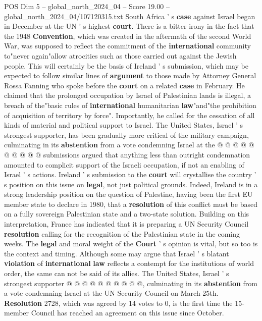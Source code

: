 \begin{textsample}{POS Dim 5 – global\_north\_2024\_04 – Score 19.00 – global\_north\_2024\_04/107120315.txt}  \label{ex:f5_pos_263}
South Africa ' s \textbf{case} against Israel began in December at the UN ' s highest \textbf{court}.
There is a bitter irony in the fact that the 1948 \textbf{Convention}, which was created in the aftermath of the second World War, was supposed to reflect the commitment of the \textbf{international} community to"never again"allow atrocities such as those carried out against the Jewish people.
This will certainly be the basis of Ireland ' s submission, which may be expected to follow similar lines of \textbf{argument} to those made by Attorney General Rossa Fanning who spoke before the \textbf{court} on a related \textbf{case} in February.
He claimed that the prolonged occupation by Israel of Palestinian lands is illegal, a breach of the"basic rules of \textbf{international} humanitarian \textbf{law}"and"the prohibition of acquisition of territory by force".
Importantly, he called for the cessation of all kinds of material and political support to Israel.
The United States, Israel ' s strongest supporter, has been gradually more critical of the military campaign, culminating in its \textbf{abstention} from a vote condemning Israel at the @ @ @ @ @ @ @ @ @ @ submissions argued that anything less than outright condemnation amounted to complicit support of the Israeli occupation, if not an enabling of Israel ' s actions.
Ireland ' s submission to the \textbf{court} will crystallise the country ' s position on this issue on \textbf{legal}, not just political grounds.
Indeed, Ireland is in a strong leadership position on the question of Palestine, having been the first EU member state to declare in 1980, that a \textbf{resolution} of this conflict must be based on a fully sovereign Palestinian state and a two-state solution.
Building on this interpretation, France has indicated that it is preparing a UN Security Council \textbf{resolution} calling for the recognition of the Palestinian state in the coming weeks.
The \textbf{legal} and moral weight of the \textbf{Court} ' s opinion is vital, but so too is the context and timing.
Although some may argue that Israel ' s blatant \textbf{violation} of \textbf{international} \textbf{law} reflects a contempt for the institutions of world order, the same can not be said of its allies.
The United States, Israel ' s strongest supporter @ @ @ @ @ @ @ @ @ @, culminating in its \textbf{abstention} from a vote condemning Israel at the UN Security Council on March 25th. \textbf{Resolution} 2728, which was agreed by 14 votes to 0, is the first time the 15-member Council has reached an agreement on this issue since October.

\end{textsample}
